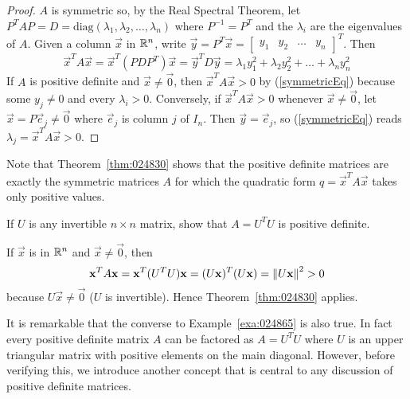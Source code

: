 \documentclass{ximera}
\begin{document}
\begin{proof}
$A$ is symmetric so, by the Real Spectral Theorem, let $P^{T}AP = D = \mbox{diag}(\lambda_{1}, \lambda_{2}, \dots, \lambda_{n})$ where $P^{-1} = P^{T}$ and the $\lambda_{i}$ are the eigenvalues of $A$. Given a column $\vec{x}$ in $\mathbb{R}^n$, write $\vec{y} = P^{T}\vec{x} = \left[ \begin{array}{cccc}
y_{1} & y_{2} & \dots & y_{n}
\end{array}\right]^T$. Then
\begin{equation} \label{symmetricEq}
\vec{x}^TA\vec{x} = \vec{x}^T(PDP^T)\vec{x} = \vec{y}^TD\vec{y} = \lambda_{1}y_{1}^2 + \lambda_{2}y_{2}^2 + \dots + \lambda_{n}y_{n}^2
\end{equation}
If $A$ is positive definite and $\vec{x} \neq \vec{0}$, then $\vec{x}^{T}A\vec{x} > 0$ by (\ref{symmetricEq}) because some $y_{j} \neq 0$ and every $\lambda_{i} > 0$. Conversely, if $\vec{x}^{T}A\vec{x} > 0$ whenever $\vec{x} \neq \vec{0}$, let $\vec{x} = P\vec{e}_{j} \neq \vec{0}$ where $\vec{e}_{j}$ is column $j$ of $I_{n}$. Then $\vec{y} = \vec{e}_{j}$, so (\ref{symmetricEq}) reads $\lambda_{j} = \vec{x}^{T}A\vec{x} > 0$.
\end{proof}

Note that Theorem~\ref{thm:024830} shows that the positive definite matrices are exactly the symmetric matrices $A$ for which the quadratic form $q = \vec{x}^{T}A\vec{x}$ takes only positive values.

\begin{example}\label{exa:024865}
If $U$ is any invertible $n \times n$ matrix, show that $A = U^{T}U$ is positive definite.


\begin{solution}
  If $\vec{x}$ is in $\mathbb{R}^n$ and $\vec{x} \neq \vec{0}$, then
\begin{equation*}
\mathbf{x}^TA\mathbf{x} =  \mathbf{x}^T(U^TU)\mathbf{x} = (U\mathbf{x})^T(U\mathbf{x})= \left\lVert U\mathbf{x} \right\rVert^2 > 0
\end{equation*}
because $U\vec{x} \neq \vec{0}$ ($U$ is invertible). Hence Theorem~\ref{thm:024830} applies.
\end{solution}
\end{example}

It is remarkable that the converse to Example~\ref{exa:024865} is also true. In fact every positive definite matrix $A$ can be factored as $A = U^{T}U$ where $U$ is an upper triangular matrix with positive elements on the main
diagonal. However, before verifying this, we introduce another concept
that is central to any discussion of positive definite matrices.
\end{document}
